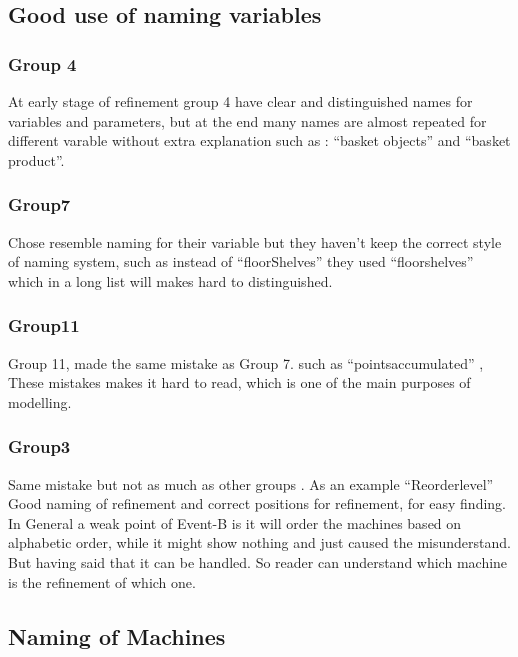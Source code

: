 \subsection{Good use of naming variables}
\label{gooduseofnamingvariables}

\subsubsection{Group 4}
\label{group4}

At early stage of refinement group 4 have clear and distinguished names for variables and parameters, but at the end many names are almost repeated for different varable without extra explanation such as : “basket objects” and “basket product”. 

\subsubsection{Group7}
\label{group7}

Chose resemble naming for their variable but they haven't keep the correct style of naming system, such as instead of “floorShelves” they used “floorshelves” which in a long list will makes hard to distinguished. 

\subsubsection{Group11}
\label{group11}

Group 11, made the same mistake as Group 7. such as “pointsaccumulated” , These mistakes makes it hard to read, which is one of the main purposes of modelling. 

\subsubsection{Group3}
\label{group3}

Same mistake but not as much as other groups . As an example “Reorderlevel” Good naming of refinement and correct positions for refinement, for easy finding. In General a weak point of Event-B is it will order the machines based on alphabetic order, while it might show nothing and just caused the misunderstand. But having said that it can be handled. So reader can understand which machine is the refinement of which one.

\subsection{Naming of Machines}
\label{namingofmachines}

